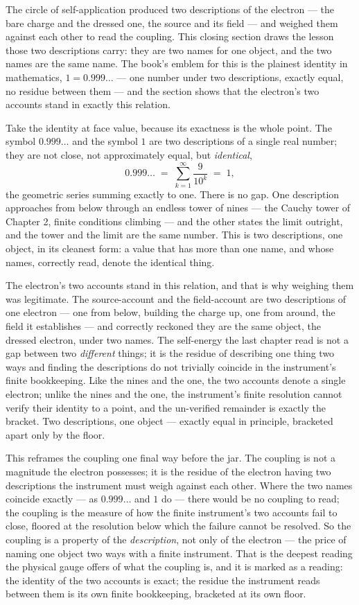 The circle of self-application produced two descriptions of the electron --- the bare charge and the dressed one, the source
and its field --- and weighed them against each other to read the coupling. This closing section draws the lesson those two
descriptions carry: they are two names for one object, and the two names are the same name. The book's emblem for this is the
plainest identity in mathematics, $1 = 0.999\ldots$ --- one number under two descriptions, exactly equal, no residue between
them --- and the section shows that the electron's two accounts stand in exactly this relation.

Take the identity at face value, because its exactness is the whole point. The symbol $0.999\ldots$ and the symbol $1$ are
two descriptions of a single real number; they are not close, not approximately equal, but \emph{identical},
\[
  0.999\ldots \;=\; \sum_{k=1}^{\infty} \frac{9}{10^k} \;=\; 1 ,
\]
the geometric series summing exactly to one. There is no gap. One description approaches from below through an endless tower
of nines --- the Cauchy tower of Chapter 2, finite conditions climbing --- and the other states the limit outright, and the
tower and the limit are the same number. This is two descriptions, one object, in its cleanest form: a value that has more
than one name, and whose names, correctly read, denote the identical thing.

The electron's two accounts stand in this relation, and that is why weighing them was legitimate. The source-account and the
field-account are two descriptions of one electron --- one from below, building the charge up, one from around, the field it
establishes --- and correctly reckoned they are the same object, the dressed electron, under two names. The self-energy the
last chapter read is not a gap between two \emph{different} things; it is the residue of describing one thing two ways and
finding the descriptions do not trivially coincide in the instrument's finite bookkeeping. Like the nines and the one, the
two accounts denote a single electron; unlike the nines and the one, the instrument's finite resolution cannot verify their
identity to a point, and the un-verified remainder is exactly the bracket. Two descriptions, one object --- exactly equal in
principle, bracketed apart only by the floor.

This reframes the coupling one final way before the jar. The coupling is not a magnitude the electron possesses; it is the
residue of the electron having two descriptions the instrument must weigh against each other. Where the two names coincide
exactly --- as $0.999\ldots$ and $1$ do --- there would be no coupling to read; the coupling is the measure of how the
finite instrument's two accounts fail to close, floored at the resolution below which the failure cannot be resolved. So the
coupling is a property of the \emph{description}, not only of the electron --- the price of naming one object two ways with a
finite instrument. That is the deepest reading the physical gauge offers of what the coupling is, and it is marked as a
reading: the identity of the two accounts is exact; the residue the instrument reads between them is its own finite
bookkeeping, bracketed at its own floor.

